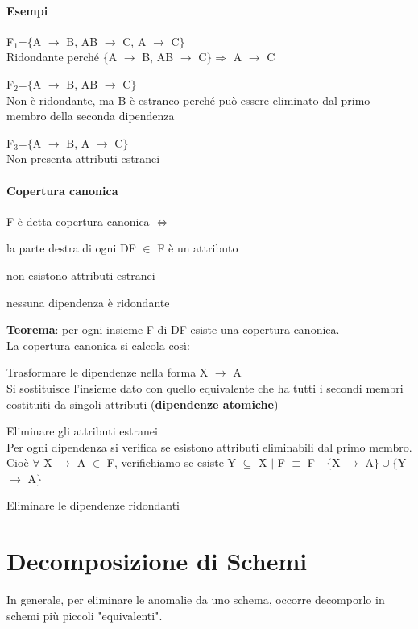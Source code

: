 \documentclass[10pt]{book}
\begin{document}
\paragraph{Esempi}
\begin{list}{}{}
	\item F$_1$=$\{$A $\rightarrow$ B, AB $\rightarrow$ C, A $\rightarrow$ C$\}$\\
	Ridondante perché $\{$A $\rightarrow$ B, AB $\rightarrow$ C$\}\Rightarrow$ A $\rightarrow$ C
	\item F$_2$=$\{$A $\rightarrow$ B, AB $\rightarrow$ C$\}$\\
	Non è ridondante, ma B è estraneo perché può essere eliminato dal primo membro della seconda dipendenza
	\item F$_3$=$\{$A $\rightarrow$ B, A $\rightarrow$ C$\}$\\
	Non presenta attributi estranei
\end{list}
\paragraph{Copertura canonica} F è detta copertura canonica $\Leftrightarrow$ \begin{list}{}{}
	\item la parte destra di ogni DF $\in$ F è un attributo
	\item non esistono attributi estranei
	\item nessuna dipendenza è ridondante
\end{list}
\textbf{Teorema}: per ogni insieme F di DF esiste una copertura canonica.\\
La copertura canonica si calcola così:
\begin{list}{}{}
	\item Trasformare le dipendenze nella forma X $\rightarrow$ A\\
Si sostituisce l'insieme dato con quello equivalente che ha tutti i secondi membri costituiti da singoli attributi (\textbf{dipendenze atomiche})
	\item Eliminare gli attributi estranei\\
Per ogni dipendenza si verifica se esistono attributi eliminabili dal primo membro. Cioè $\forall$ X $\rightarrow$ A $\in$ F, verifichiamo se esiste Y $\subseteq$ X $|$ F $\equiv$ F - $\{$X $\rightarrow$ A$\}\cup\{$Y $\rightarrow$ A$\}$
	\item Eliminare le dipendenze ridondanti
\end{list}
\section{Decomposizione di Schemi}
In generale, per eliminare le anomalie da uno schema, occorre decomporlo in schemi più piccoli "equivalenti".
\end{document}
